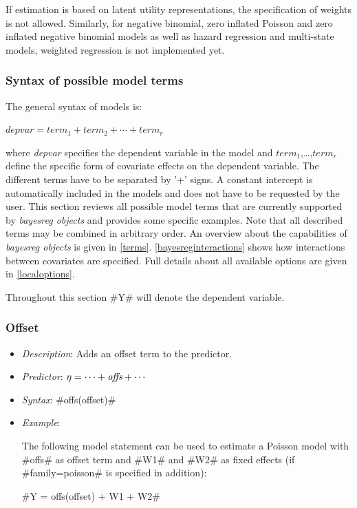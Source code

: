 If estimation is based on latent utility representations, the
specification of weights is not allowed. Similarly, for negative
binomial, zero inflated Poisson and zero inflated negative
binomial models as well as hazard regression and multi-state
models, weighted regression is not implemented yet.

\subsubsection{Syntax of possible model terms}
\label{modelsyntax}

The general syntax of models is:

$depvar = term_1 + term_2 + \cdots + term_r$

where {\em depvar} specifies the dependent variable in the model
and $term_1$,\dots,$term_r$ define the specific form of covariate
effects on the dependent variable. The different terms have to be
separated by '+' signs. A constant intercept is automatically
included in the models and does not have to be requested by the
user. This section reviews all possible model terms that are
currently supported by {\em bayesreg objects} and provides some
specific examples. Note that all described terms may be combined
in arbitrary order. An overview about the capabilities of {\em
bayesreg objects} is given in \autoref{terms}.
\autoref{bayesreginteractions} shows how interactions between
covariates are specified. Full details about all available options
are given in \autoref{localoptions}.

Throughout this section #Y# will denote the dependent variable.

\subsubsection*{Offset}

\begin{itemize}
\item[] {\em Description}: Adds an offset term to the predictor.
\item[] {\em Predictor}: $\eta =  \cdots + \mbox{\it offs} + \cdots$
\item[] {\em Syntax}: #offs(offset)#
\item[] {\em Example}:

The following model statement can be used to estimate a Poisson
model with #offs# as offset term and #W1# and #W2# as fixed
effects (if #family=poisson# is specified in addition):

#Y = offs(offset) + W1 + W2#

\end{itemize}

